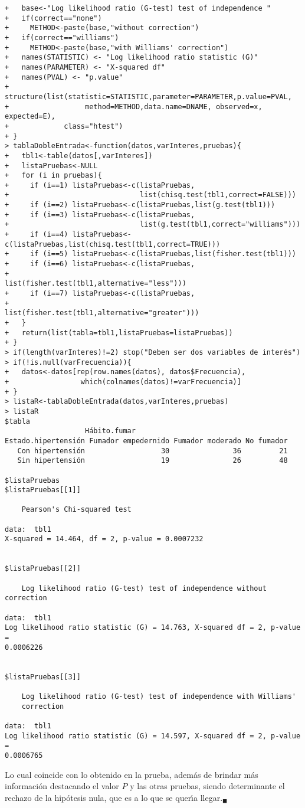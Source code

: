 \begin{solucion}
\begin{verbatim}
+   base<-"Log likelihood ratio (G-test) test of independence "
+   if(correct=="none")
+     METHOD<-paste(base,"without correction")
+   if(correct=="williams")
+     METHOD<-paste(base,"with Williams' correction")
+   names(STATISTIC) <- "Log likelihood ratio statistic (G)"
+   names(PARAMETER) <- "X-squared df"
+   names(PVAL) <- "p.value"
+   structure(list(statistic=STATISTIC,parameter=PARAMETER,p.value=PVAL,
+                  method=METHOD,data.name=DNAME, observed=x, expected=E),
+             class="htest")
+ }
> tablaDobleEntrada<-function(datos,varInteres,pruebas){
+   tbl1<-table(datos[,varInteres])
+   listaPruebas<-NULL
+   for (i in pruebas){
+     if (i==1) listaPruebas<-c(listaPruebas,
+                               list(chisq.test(tbl1,correct=FALSE)))
+     if (i==2) listaPruebas<-c(listaPruebas,list(g.test(tbl1)))
+     if (i==3) listaPruebas<-c(listaPruebas,
+                               list(g.test(tbl1,correct="williams")))
+     if (i==4) listaPruebas<-c(listaPruebas,list(chisq.test(tbl1,correct=TRUE)))
+     if (i==5) listaPruebas<-c(listaPruebas,list(fisher.test(tbl1)))
+     if (i==6) listaPruebas<-c(listaPruebas,
+                               list(fisher.test(tbl1,alternative="less")))
+     if (i==7) listaPruebas<-c(listaPruebas,
+                               list(fisher.test(tbl1,alternative="greater")))
+   }
+   return(list(tabla=tbl1,listaPruebas=listaPruebas))
+ }
> if(length(varInteres)!=2) stop("Deben ser dos variables de interés")
> if(!is.null(varFrecuencia)){
+   datos<-datos[rep(row.names(datos), datos$Frecuencia),
+                 which(colnames(datos)!=varFrecuencia)]
+ }
> listaR<-tablaDobleEntrada(datos,varInteres,pruebas)
> listaR
$tabla
                   Hábito.fumar
Estado.hipertensión Fumador empedernido Fumador moderado No fumador
   Con hipertensión                  30               36         21
   Sin hipertensión                  19               26         48

$listaPruebas
$listaPruebas[[1]]

	Pearson's Chi-squared test

data:  tbl1
X-squared = 14.464, df = 2, p-value = 0.0007232


$listaPruebas[[2]]

	Log likelihood ratio (G-test) test of independence without correction

data:  tbl1
Log likelihood ratio statistic (G) = 14.763, X-squared df = 2, p-value =
0.0006226


$listaPruebas[[3]]

	Log likelihood ratio (G-test) test of independence with Williams'
	correction

data:  tbl1
Log likelihood ratio statistic (G) = 14.597, X-squared df = 2, p-value =
0.0006765
 \end{verbatim}
 \vspace{-0.5cm}
 Lo cual coincide con lo obtenido en la prueba,
 adem\'as de brindar m\'as informaci\'on destacando el valor $P$
 y las otras pruebas, siendo determinante el rechazo de la hip\'otesis nula,
 que es a lo que se quer\'{\i}a llegar.${}_{\blacksquare}$
\end{solucion}
